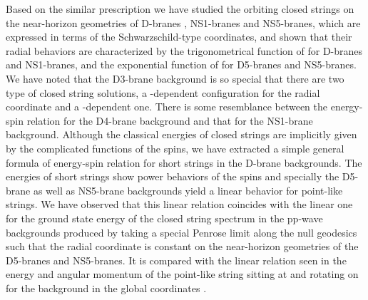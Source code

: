 \documentclass[12pt,a4paper]{article}
\begin{document}
Based on the similar prescription we have studied the orbiting closed
strings on the near-horizon geometries of D\coordHE{}-branes \coordHE{},
NS1-branes and NS5-branes, which are expressed in terms of the
Schwarzschild-type coordinates, and shown that their radial behaviors
are characterized by the trigonometrical function of \myHighlight{$\sigma$}\coordHE{} for
D\coordHE{}-branes \coordHE{} and NS1-branes, and the exponential
function of \myHighlight{$\sigma$}\coordHE{} for D5-branes and NS5-branes.
We have noted that the D3-brane background is so special that there
are two type of closed string solutions, a \myHighlight{$\tau$}\coordHE{}-dependent configuration
for the radial coordinate and a \myHighlight{$\sigma$}\coordHE{}-dependent one.
There is some resemblance between the energy-spin relation for the 
D4-brane background and that for the NS1-brane background.
Although the classical energies of closed strings are implicitly given
by the complicated functions of the spins, we have extracted
a simple general formula of energy-spin relation for short strings
in the D\coordHE{}-brane backgrounds. The energies of short strings show 
power behaviors of the spins and specially the D5-brane as well as 
NS5-brane backgrounds yield a linear behavior for point-like 
strings. We have observed that this linear relation coincides
with the linear one for the ground state energy of the closed string
spectrum in the pp-wave backgrounds produced by taking a special Penrose
limit along the null geodesics such that the radial coordinate is 
constant on the near-horizon geometries of the D5-branes and NS5-branes.
It is compared with the linear relation seen in the energy and angular
momentum  of the point-like string sitting at \coordHE{} and rotating
on \coordHE{} for the \coordHE{} background in the global coordinates
\cite{SIA}.
\end{document}
